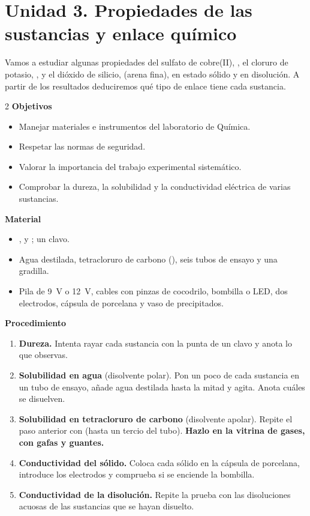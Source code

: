 \section{Unidad 3. Propiedades de las sustancias y enlace químico}

Vamos a estudiar algunas propiedades del sulfato de cobre(II), , el cloruro de potasio, , y el dióxido de silicio,  (arena fina), en estado sólido y en disolución. A partir de los resultados deduciremos qué tipo de enlace tiene cada sustancia.

\begin{multicols}{2}
    \textbf{Objetivos}
    \begin{itemize}
        \item Manejar materiales e instrumentos del laboratorio de Química.
        \item Respetar las normas de seguridad.
        \item Valorar la importancia del trabajo experimental sistemático.
        \item Comprobar la dureza, la solubilidad y la conductividad eléctrica de varias sustancias.
    \end{itemize}
    \columnbreak
    \textbf{Material}
    \begin{itemize}
        \item {},  y ; un clavo.
        \item Agua destilada, tetracloruro de carbono (), seis tubos de ensayo y una gradilla.
        \item Pila de \qty{9}{\volt} o \qty{12}{\volt}, cables con pinzas de cocodrilo, bombilla o LED, dos electrodos, cápsula de porcelana y vaso de precipitados.
    \end{itemize}
\end{multicols}

\textbf{Procedimiento}
\begin{enumerate}[label=\numberballgreen]
    \item \textbf{Dureza.} Intenta rayar cada sustancia con la punta de un clavo y anota lo que observas.
    \item \textbf{Solubilidad en agua} (disolvente polar). Pon un poco de cada sustancia en un tubo de ensayo, añade agua destilada hasta la mitad y agita. Anota cuáles se disuelven.
    \item \textbf{Solubilidad en tetracloruro de carbono} (disolvente apolar). Repite el paso anterior con  (hasta un tercio del tubo). \textbf{Hazlo en la vitrina de gases, con gafas y guantes.}
    \item \textbf{Conductividad del sólido.} Coloca cada sólido en la cápsula de porcelana, introduce los electrodos y comprueba si se enciende la bombilla.
    \item \textbf{Conductividad de la disolución.} Repite la prueba con las disoluciones acuosas de las sustancias que se hayan disuelto.
\end{enumerate}

